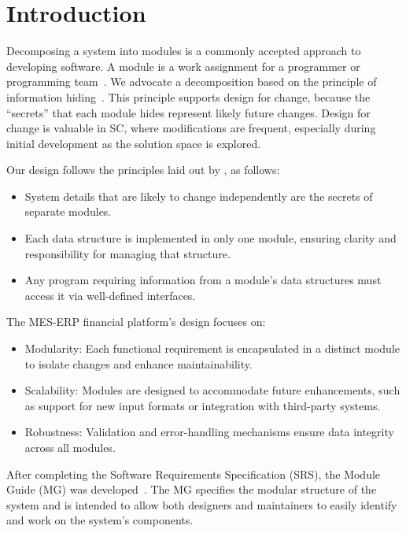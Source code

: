 \documentclass[12pt, titlepage]{article}
\begin{document}
\newpage

\tableofcontents

\listoftables

\listoffigures

\newpage


\section{Introduction}

Decomposing a system into modules is a commonly accepted approach to developing
software.  A module is a work assignment for a programmer or programming
team~\citep{ParnasEtAl1984}.  We advocate a decomposition
based on the principle of information hiding~\citep{Parnas1972a}.  This
principle supports design for change, because the ``secrets'' that each module
hides represent likely future changes.  Design for change is valuable in SC,
where modifications are frequent, especially during initial development as the
solution space is explored.  

Our design follows the principles laid out by \citet{ParnasEtAl1984}, as follows:
\begin{itemize}
    \item System details that are likely to change independently are the secrets of separate modules.
    \item Each data structure is implemented in only one module, ensuring clarity and responsibility for managing that structure.
    \item Any program requiring information from a module's data structures must access it via well-defined interfaces.
\end{itemize}

The MES-ERP financial platform's design focuses on:
\begin{itemize}
    \item Modularity: Each functional requirement is encapsulated in a distinct module to isolate changes and enhance maintainability.
    \item Scalability: Modules are designed to accommodate future enhancements, such as support for new input formats or integration with third-party systems.
    \item Robustness: Validation and error-handling mechanisms ensure data integrity across all modules.
\end{itemize}

After completing the Software Requirements Specification (SRS), the Module Guide (MG) was developed~\citep{ParnasEtAl1984}. The MG specifies the modular structure of the system and is intended to allow both designers and maintainers to easily identify and work on the system's components.
\end{document}
